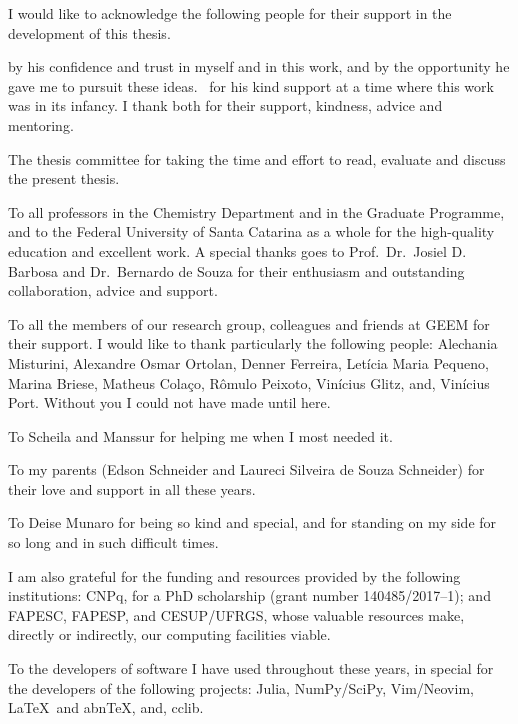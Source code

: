 \begin{agradecimentos}[Acknowledgements]
	I would like to acknowledge the following people for their support in the
	development of this thesis.

	\imprimirorientador{} by his confidence and trust in myself and in this work, and by the
	opportunity he gave me to pursuit these ideas.
	\imprimircoorientador\ for his kind support at a time where this work was in its
	infancy.
	I thank both for their support, kindness, advice and mentoring.

	The thesis committee for taking the time and effort to read, evaluate and
	discuss the present thesis.

	To all professors in the Chemistry Department and in the Graduate Programme, and to the Federal University of
	Santa Catarina as a whole
	for the high-quality education and excellent work.
	A special thanks goes to Prof.\ Dr.\ Josiel D. Barbosa and
	Dr.\ Bernardo de Souza
	for their enthusiasm and outstanding collaboration, advice and support.

	To all the members of our research group, colleagues and friends at GEEM for
	their support.
	I would like to thank particularly the following people:
	Alechania Misturini,
	Alexandre Osmar Ortolan,
	Denner Ferreira,
	Letícia Maria Pequeno,
	Marina Briese,
	Matheus Colaço,
	Rômulo Peixoto,
	Vinícius Glitz,
	and,
	Vinícius Port.
	Without you I could not have made until here.

	To Scheila and Manssur for helping me when I most needed it.

	To my parents (Edson Schneider and Laureci Silveira de Souza Schneider)
	for their love and support in all these years.

	To Deise Munaro for being so kind and special,
	and for standing on my side for so long and in such difficult times.

	I am also grateful for the funding and resources provided by the following institutions:
	CNPq, for a PhD scholarship (grant number 140485/2017--1);
	and FAPESC, FAPESP, and CESUP/UFRGS, whose valuable resources make, directly or
	indirectly, our computing facilities
	viable.

	To the developers of software I have used throughout these years, in special for
	the developers of the following projects:
	Julia,
	NumPy/SciPy,
	Vim/Neovim,
	\LaTeX\ and abn\TeX{},
	and,
	cclib.

\end{agradecimentos}
